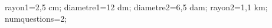 \documentclass[exercice]{thedocument}%
\begin{document}
%
    \>rayon1=2,5 cm;%
    \>diametre1=12 dm;%
    \>diametre2=6,5 dam;%
    \>rayon2=1,1 km;%
    \>numquestions=2;%
\end{document}
